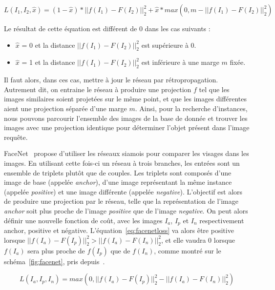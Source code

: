 \begin{equation}
L(I_1, I_2, \hat{x}) = (1-\hat{x})*||f(I_1)-F(I_2)||_2^2 + \hat{x}*max(0,m-||f(I_1)-F(I_2)||_2^2)
\label{eq:coupleloss}
\end{equation}

Le résultat de cette équation est différent de 0 dans les cas suivants :
\begin{itemize}
	\item $\hat{x}$ = 0 et la distance $||f(I_1)-F(I_2)||_2^2$ est supérieure à 0.
	\item $\hat{x}$ = 1 et la distance $||f(I_1)-F(I_2)||_2^2$ est inférieure à une marge $m$ fixée.
\end{itemize}

Il faut alors, dans ces cas, mettre à jour le réseau par rétropropagation. 
Autrement dit, on entraine le réseau à produire une projection $f$ tel que les images similaires soient projetées sur le même point, et que les images différentes aient une projection séparée d'une marge $m$.
Ainsi, pour la recherche d'instances, nous pouvons parcourir l'ensemble des images de la base de donnée et trouver les images avec une projection identique pour déterminer l'objet présent dans l'image requête.

FaceNet~\cite{schroff2015facenet} propose d'utiliser les réseaux siamois pour comparer les visages dans les images.
En utilisant cette fois-ci un réseau à trois branches, les entrées sont un ensemble de triplets plutôt que de couples.
Les triplets sont composés d'une image de base (appelée \textit{anchor}), d'une image représentant la même instance (appelée \textit{positive}) et une image différente (appelée \textit{negative}).
L'objectif est alors de produire une projection par le réseau, telle que la représentation de l'image \textit{anchor} soit plus proche de l'image \textit{positive} que de l'image \textit{negative}.
On peut alors définir une nouvelle fonction de coût, avec les images $I_a$, $I_p$ et $I_n$ respectivement anchor, positive et négative.
L'équation~\ref{eq:facenetloss} va alors être positive lorsque $||f(I_a)-F(I_p)||_2^2 > ||f(I_a)-F(I_n)||_2^2$, et elle vaudra 0 lorsque $f(I_a)$ sera plus proche de $f(I_p)$ que de $f(I_n)$, comme montré sur le schéma~\ref{fig:facenet}, pris depuis~\cite{schroff2015facenet}.

\begin{equation}
L(I_a, I_p, I_n) = max(0, ||f(I_a)-F(I_p)||_2^2 - ||f(I_a)-F(I_n)||_2^2)
\label{eq:facenetloss}
\end{equation}

